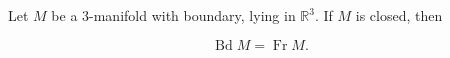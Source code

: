 Let $M$ be a 3-manifold with boundary, lying in $\mathbb{R}^3$. If $M$ is closed, then

$$\operatorname{Bd} M = \operatorname{Fr} M.$$
